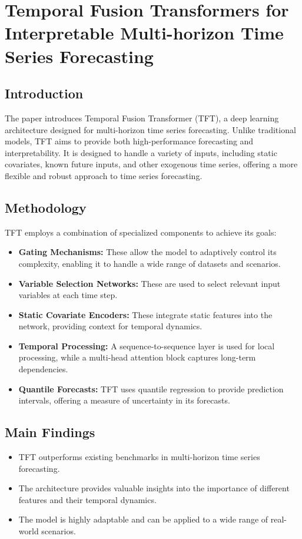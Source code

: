 \documentclass{article}
\begin{document}
\newpage
\section{Temporal Fusion Transformers for Interpretable Multi-horizon Time Series Forecasting}

\subsection{Introduction}
The paper introduces Temporal Fusion Transformer (TFT), a deep learning architecture designed for multi-horizon time series forecasting. Unlike traditional models, TFT aims to provide both high-performance forecasting and interpretability. It is designed to handle a variety of inputs, including static covariates, known future inputs, and other exogenous time series, offering a more flexible and robust approach to time series forecasting.

\subsection{Methodology}
TFT employs a combination of specialized components to achieve its goals:

\begin{itemize}
    \item \textbf{Gating Mechanisms:} These allow the model to adaptively control its complexity, enabling it to handle a wide range of datasets and scenarios.
    \item \textbf{Variable Selection Networks:} These are used to select relevant input variables at each time step.
    \item \textbf{Static Covariate Encoders:} These integrate static features into the network, providing context for temporal dynamics.
    \item \textbf{Temporal Processing:} A sequence-to-sequence layer is used for local processing, while a multi-head attention block captures long-term dependencies.
    \item \textbf{Quantile Forecasts:} TFT uses quantile regression to provide prediction intervals, offering a measure of uncertainty in its forecasts.
\end{itemize}

\subsection{Main Findings}
\begin{itemize}
    \item TFT outperforms existing benchmarks in multi-horizon time series forecasting.
    \item The architecture provides valuable insights into the importance of different features and their temporal dynamics.
    \item The model is highly adaptable and can be applied to a wide range of real-world scenarios.
\end{itemize}
\end{document}
